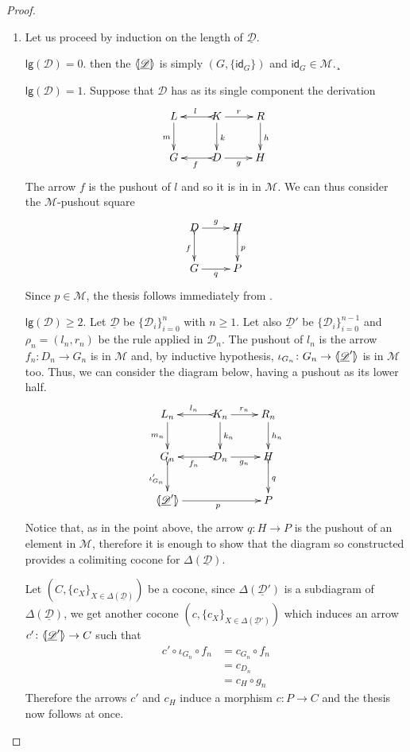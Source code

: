 \documentclass[a4paper,UKenglish,cleveref,pdftex, thm-restate,numberwithinsect]{lipics}
\newcommand{\id}[1]{\mathsf{id}_{#1}}
\newcommand{\dder}[1]{\mathscr{#1}}
\newcommand{\der}[1]{\underline{\dder{#1}}}
\newcommand{\lpro}{\langle \hspace{-1.85pt}[}
\newcommand{\rpro}{]\hspace{-1.85pt}\rangle}
\newcommand{\tpro}[1]{\lpro \der{#1}\rpro}
\newcommand{\lgh}[0]{\mathsf{lg}}
\begin{document}
\begin{proof}\begin{enumerate}
		\item Let us proceed by induction on the length of $\der{D}$.

	
	\smallskip \noindent $\lgh(\dder{D})=0$. then the $\tpro{\dder{D}}$ is simply $(G, \{\id{G}\})$ and $\id{G}\in \mathcal{M}$.¸
	
	\smallskip \noindent$\lgh(\dder{D})=1$. Suppose that $\dder{D}$ has as its single component the derivation
			\[\xymatrix{L \ar[d]_{m}& K \ar[d]^{k}\ar@{>->}[l]_{l} \ar[r]^{r} & R \ar[d]^{h} \\G& \ar@{>->}[l]^{f} D \ar[r]_{g}& H  \\}\]
			The arrow $f$ is  the pushout of $l$ and so it is in in $\mathcal{M}$. We can thus consider the $\mathcal{M}$-pushout square
			\[\xymatrix{D \ar@{>->}[d]_{f} \ar[r]^{g} & H \ar@{>->}[d]^{p} \\G \ar[r]_{q}& P }\]
			Since $p\in \mathcal{M}$, the thesis follows immediately from . 
	
	\smallskip \noindent$\lgh(\dder{D})\geq 2$. Let $\der{D}$ be $\{\dder{D}_i\}_{i=0}^n$ with $n\geq 1$. Let also $\der{D}'$ be $\{\dder{D}_i\}^{n-1}_{i=0}$ and $\rho_n=(l_n, r_n)$ be the rule applied in $\dder{D}_n$. The pushout of $l_n$ is the arrow $f_n\colon D_n\to G_n$ is in $\mathcal{M}$ and, by inductive hypothesis, $\iota_{G_{n}}\colon G_{n}\to \lpro \der{D}'\rpro$ is in $\mathcal{M}$ too. Thus, we can consider the diagram below, having a pushout as its lower half.
			\[\xymatrix{L_n \ar[d]_{m_{n}}& K_{n} \ar[d]^{k_{n}}\ar@{>->}[l]_{l_{n}} \ar[r]^{r_{n}} & R_{n} \ar[d]^{h_n} \\G_{n} \ar@{>->}[d]_{\iota'_{G_{n}}}& \ar@{>->}[l]^{f_n} D_n \ar[r]_{g_n}& H  \ar@{>->}[d]^{q}\\ \lpro \der{D}' \ar[rr]_{p}\rpro && P}\] 
			Notice that, as in the point above, the arrow $q\colon H\to P$ is the pushout of an element in $\mathcal{M}$, therefore it is enough to show that the diagram so constructed provides a colimiting cocone for $\Delta(\der{D})$.
			
			Let $(C, \{c_X\}_{X\in \Delta(\der{D})})$ be a cocone, since $\Delta(\der{D}')$ is a subdiagram of $\Delta(\der{D})$, we get another cocone $(c, \{c_X\}_{X\in \Delta(\der{D}')})$ which induces an arrow $c'\colon \lpro \der{D}' \rpro \to C$ such that
			\begin{align*}
				c'\circ \iota_{G_n} \circ f_n &=c_{G_n} \circ f_n\\&= c_{D_n}\\&= c_{H}\circ g_n
			\end{align*}
			Therefore the arrows $c'$ and $c_H$ induce a morphism $c\colon P\to C$ and the thesis now follows at once.
		

\end{enumerate}
\end{proof}
\end{document}
